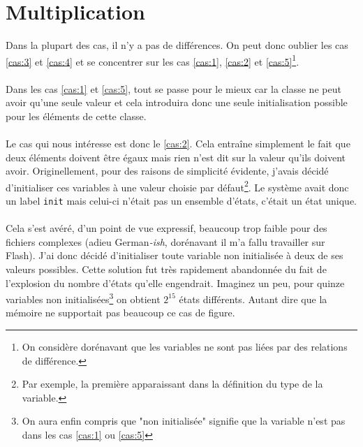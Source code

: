 \documentclass{memoir}
\begin{document}
		\section{Multiplication}
		\label{sec:mult}
		
			Dans la plupart des cas, il n'y a pas de différences. On peut donc oublier les cas \ref{cas:3} et \ref{cas:4} et se concentrer sur les cas \ref{cas:1}, \ref{cas:2} et \ref{cas:5}\footnote{On considère dorénavant que les variables ne sont pas liées par des relations de différence.}.
			
			\paragraph{} Dans les cas \ref{cas:1} et \ref{cas:5}, tout se passe pour le mieux car la classe ne peut avoir qu'une seule valeur et cela introduira donc une seule initialisation possible pour les éléments de cette classe.
		
			\paragraph{} Le cas qui nous intéresse est donc le \ref{cas:2}. Cela entra\^{i}ne simplement le fait que deux éléments doivent \^{e}tre égaux mais rien n'est dit sur la valeur qu'ils doivent avoir. Originellement, pour des raisons de simplicité évidente, j'avais décidé d'initialiser ces variables à une valeur choisie par défaut\footnote{Par exemple, la première apparaissant dans la définition du type de la variable.}. Le système avait donc un label \texttt{init} mais celui-ci n'était pas un ensemble d'états, c'était un état unique.
			
			\paragraph{} Cela s'est avéré, d'un point de vue expressif, beaucoup trop faible pour des fichiers complexes (adieu German\textit{-ish}, dorénavant il m'a fallu travailler sur Flash). J'ai donc décidé d'initialiser toute variable non initialisée à deux de ses valeurs possibles. Cette solution fut très rapidement abandonnée du fait de l'explosion du nombre d'états qu'elle engendrait. Imaginez un peu, pour quinze variables non initialisées\footnote{On aura enfin compris que "non initialisée" signifie que la variable n'est pas dans les cas \ref{cas:1} ou \ref{cas:5}} on obtient $2^{15}$ états différents. Autant dire que la mémoire ne supportait pas beaucoup ce cas de figure.
			
\end{document}
